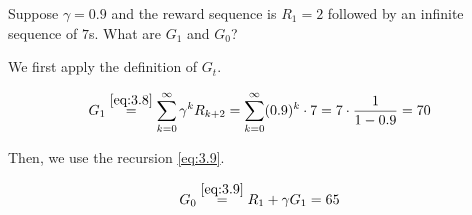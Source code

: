 
\begin{exercise}[Exercise 3.9]

Suppose $\gamma = 0.9$ and the reward sequence is $R_1 = 2$ followed by an infinite sequence of $7$s.
What are $G_1$ and $G_0$?    

\end{exercise}


\begin{solution}

We first apply the definition of $G_t$.

\begin{align*}
    G_1
    \stackrel
    {
        \eqref{eq:3.8}
    }{=}
    \sum_{k=0}^\infty
        \gamma^k R_{k+2}
    =
    \sum_{k=0}^\infty
        (0.9)^k \cdot 7
    =
    7 \cdot \frac{1}{1 - 0.9}
    =
    70
\end{align*}

Then, we use the recursion \eqref{eq:3.9}.

\begin{align*}
    G_0
    \stackrel
    {
        \eqref{eq:3.9}
    }{=}
    R_1 + \gamma G_1 = 65
\end{align*}

\end{solution}

